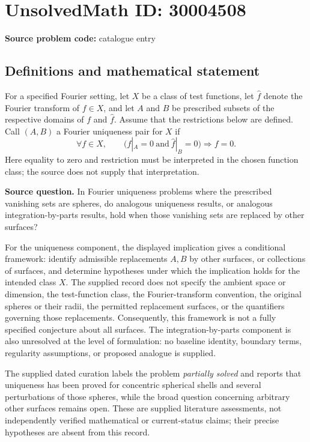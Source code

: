 \documentclass[11pt]{article}
\begin{document}
\section*{UnsolvedMath ID: 30004508}
\textbf{Source problem code:} catalogue entry
\subsection{Definitions and mathematical statement}
For a specified Fourier setting, let \(X\) be a class of test functions, let \(\widehat f\) denote the Fourier transform of \(f\in X\), and let \(A\) and \(B\) be prescribed subsets of the respective domains of \(f\) and \(\widehat f\). Assume that the restrictions below are defined. Call \((A,B)\) a Fourier uniqueness pair for \(X\) if
\[
\forall f\in X,\qquad
\bigl(f|_A=0\ \text{and}\ \widehat f|_B=0\bigr)
\Longrightarrow f=0.
\]
Here equality to zero and restriction must be interpreted in the chosen function class; the source does not supply that interpretation.

\textbf{Source question.} In Fourier uniqueness problems where the prescribed vanishing sets are spheres, do analogous uniqueness results, or analogous integration-by-parts results, hold when those vanishing sets are replaced by other surfaces?

For the uniqueness component, the displayed implication gives a conditional framework: identify admissible replacements \(A,B\) by other surfaces, or collections of surfaces, and determine hypotheses under which the implication holds for the intended class \(X\). The supplied record does not specify the ambient space or dimension, the test-function class, the Fourier-transform convention, the original spheres or their radii, the permitted replacement surfaces, or the quantifiers governing those replacements. Consequently, this framework is not a fully specified conjecture about all surfaces. The integration-by-parts component is also unresolved at the level of formulation: no baseline identity, boundary terms, regularity assumptions, or proposed analogue is supplied.

The supplied dated curation labels the problem \emph{partially solved} and reports that uniqueness has been proved for concentric spherical shells and several perturbations of those spheres, while the broad question concerning arbitrary other surfaces remains open. These are supplied literature assessments, not independently verified mathematical or current-status claims; their precise hypotheses are absent from this record.
\end{document}
